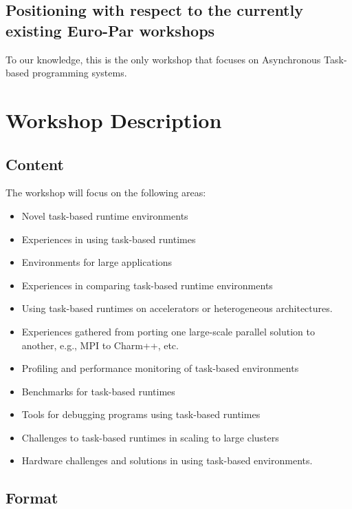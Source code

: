 \documentclass{article}
\begin{document}
\subsection*{Positioning with respect to the currently existing Euro-Par workshops}

To our knowledge, this is the only workshop that focuses on Asynchronous Task-based programming systems.

\section*{Workshop Description}

\subsection*{Content}

The workshop will focus on the following areas:
\begin{itemize}
\item Novel task-based runtime environments
\item Experiences in using task-based runtimes
\item Environments for large applications
\item Experiences in comparing task-based runtime environments
\item Using task-based runtimes on accelerators or heterogeneous architectures.
\item Experiences gathered from porting one large-scale parallel solution to another, e.g., MPI to Charm++, etc.
\item Profiling and performance monitoring of task-based environments
\item Benchmarks for task-based runtimes
\item Tools for debugging programs using task-based runtimes
\item Challenges to task-based runtimes in scaling to large clusters
\item Hardware challenges and solutions in using task-based environments.
\end{itemize}

\subsection*{Format}
\end{document}
